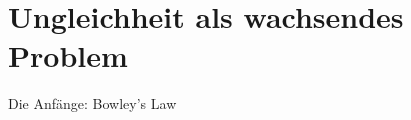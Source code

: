 %
%
%

\chapter{Ungleichheit als wachsendes Problem}
\label{Ungleichheit}

Die Anfänge: Bowley's Law




